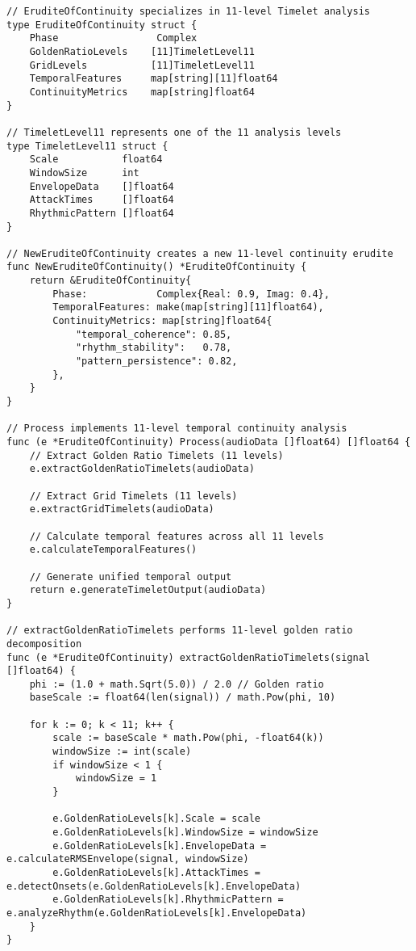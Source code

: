 \begin{tcolorbox}[colback=CodeBackground, colframe=DarkGray, title=Erudite of Continuity Implementation, fonttitle=\bfseries]
\begin{verbatim}
// EruditeOfContinuity specializes in 11-level Timelet analysis
type EruditeOfContinuity struct {
    Phase                 Complex
    GoldenRatioLevels    [11]TimeletLevel11
    GridLevels           [11]TimeletLevel11
    TemporalFeatures     map[string][11]float64
    ContinuityMetrics    map[string]float64
}

// TimeletLevel11 represents one of the 11 analysis levels
type TimeletLevel11 struct {
    Scale           float64
    WindowSize      int
    EnvelopeData    []float64
    AttackTimes     []float64
    RhythmicPattern []float64
}

// NewEruditeOfContinuity creates a new 11-level continuity erudite
func NewEruditeOfContinuity() *EruditeOfContinuity {
    return &EruditeOfContinuity{
        Phase:            Complex{Real: 0.9, Imag: 0.4},
        TemporalFeatures: make(map[string][11]float64),
        ContinuityMetrics: map[string]float64{
            "temporal_coherence": 0.85,
            "rhythm_stability":   0.78,
            "pattern_persistence": 0.82,
        },
    }
}

// Process implements 11-level temporal continuity analysis
func (e *EruditeOfContinuity) Process(audioData []float64) []float64 {
    // Extract Golden Ratio Timelets (11 levels)
    e.extractGoldenRatioTimelets(audioData)
    
    // Extract Grid Timelets (11 levels)
    e.extractGridTimelets(audioData)
    
    // Calculate temporal features across all 11 levels
    e.calculateTemporalFeatures()
    
    // Generate unified temporal output
    return e.generateTimeletOutput(audioData)
}

// extractGoldenRatioTimelets performs 11-level golden ratio decomposition
func (e *EruditeOfContinuity) extractGoldenRatioTimelets(signal []float64) {
    phi := (1.0 + math.Sqrt(5.0)) / 2.0 // Golden ratio
    baseScale := float64(len(signal)) / math.Pow(phi, 10)
    
    for k := 0; k < 11; k++ {
        scale := baseScale * math.Pow(phi, -float64(k))
        windowSize := int(scale)
        if windowSize < 1 {
            windowSize = 1
        }
        
        e.GoldenRatioLevels[k].Scale = scale
        e.GoldenRatioLevels[k].WindowSize = windowSize
        e.GoldenRatioLevels[k].EnvelopeData = e.calculateRMSEnvelope(signal, windowSize)
        e.GoldenRatioLevels[k].AttackTimes = e.detectOnsets(e.GoldenRatioLevels[k].EnvelopeData)
        e.GoldenRatioLevels[k].RhythmicPattern = e.analyzeRhythm(e.GoldenRatioLevels[k].EnvelopeData)
    }
}


\end{verbatim}
\end{tcolorbox}
